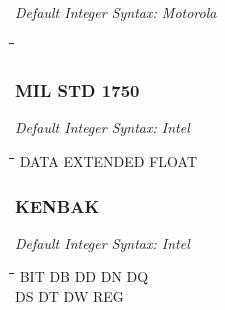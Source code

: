 {\em Default Integer Syntax: Motorola}

{\tt\begin{tabbing}
\hspace{3cm}\=\hspace{3cm}\=\hspace{3cm}\=\hspace{3cm}\=\kill
\end{tabbing}}

\subsubsection{MIL STD 1750}

{\em Default Integer Syntax: Intel}

{\tt\begin{tabbing}
\hspace{3cm}\=\hspace{3cm}\=\hspace{3cm}\=\hspace{3cm}\=\kill
DATA       \> EXTENDED    \> FLOAT \\
\end{tabbing}}

\subsubsection{KENBAK}

{\em Default Integer Syntax: Intel}

{\tt\begin{tabbing}
\hspace{3cm}\=\hspace{3cm}\=\hspace{3cm}\=\hspace{3cm}\=\kill
BIT        \> DB          \> DD          \> DN          \> DQ \\
DS         \> DT          \> DW          \> REG \\
\end{tabbing}}

